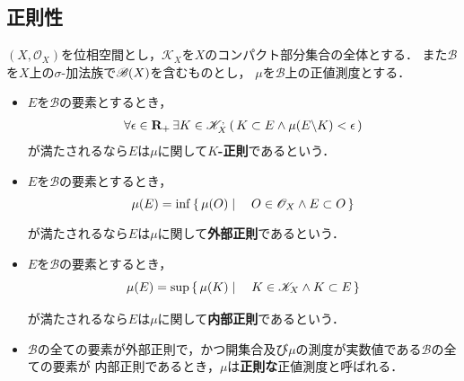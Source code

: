 	\subsection{正則性}
		\begin{screen}
			\begin{dfn}[正値測度の正則性]
				$(X,\mathscr{O}_X)$を位相空間とし，$\mathscr{K}_X$を$X$のコンパクト部分集合の全体とする．
				また$\mathcal{B}$を$X$上の$\sigma$-加法族で$\mathscr{B}(X)$を含むものとし，
				$\mu$を$\mathcal{B}$上の正値測度とする．
				\begin{itemize}
					\item $E$を$\mathcal{B}$の要素とするとき，
						\begin{align}
							\forall \epsilon \in \mathbf{R}_+\, \exists K \in \mathscr{K}_X^,
							\left(\, K \subset E \wedge \mu(E \backslash K) < \epsilon\, \right)
						\end{align}
						が満たされるなら$E$は$\mu$に関して{\bf $K$-正則}であるという．
						
					\item $E$を$\mathcal{B}$の要素とするとき，
						\begin{align}
							\mu(E) = \operatorname*{inf}_{} \left\{\, \mu(O) \mid \quad O \in \mathscr{O}_X \wedge E \subset O\, \right\}
						\end{align}
						が満たされるなら$E$は$\mu$に関して{\bf 外部正則}であるという．
						
					\item $E$を$\mathcal{B}$の要素とするとき，
						\begin{align}
							\mu(E) = \operatorname*{sup}_{} \left\{\, \mu(K) \mid \quad K \in \mathscr{K}_X \wedge K \subset E\, \right\}
						\end{align}
						が満たされるなら$E$は$\mu$に関して{\bf 内部正則}であるという．
					
					\item $\mathcal{B}$の全ての要素が外部正則で，かつ開集合及び$\mu$の測度が実数値である$\mathcal{B}$の全ての要素が
						内部正則であるとき，$\mu$は{\bf 正則な}正値測度と呼ばれる．
				\end{itemize}
			\end{dfn}
		\end{screen}
		
		\begin{screen}
			\begin{thm}[$C_c$上のRieszの表現定理]
			\end{thm}
		\end{screen}
		

